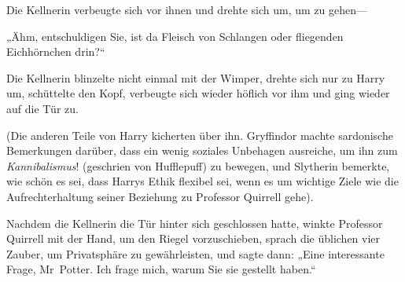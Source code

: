 Die Kellnerin verbeugte sich vor ihnen und drehte sich um, um zu gehen—

„Ähm, entschuldigen Sie, ist da Fleisch von Schlangen oder fliegenden Eichhörnchen drin?“

Die Kellnerin blinzelte nicht einmal mit der Wimper, drehte sich nur zu Harry um, schüttelte den Kopf, verbeugte sich wieder höflich vor ihm und ging wieder auf die Tür zu.

(Die anderen Teile von Harry kicherten über ihn. Gryffindor machte sardonische Bemerkungen darüber, dass ein wenig soziales Unbehagen ausreiche, um ihn zum \emph{Kannibalismus}! (geschrien von Hufflepuff) zu bewegen, und Slytherin bemerkte, wie schön es sei, dass Harrys Ethik flexibel sei, wenn es um wichtige Ziele wie die Aufrechterhaltung seiner Beziehung zu Professor Quirrell gehe).

Nachdem die Kellnerin die Tür hinter sich geschlossen hatte, winkte Professor Quirrell mit der Hand, um den Riegel vorzuschieben, sprach die üblichen vier Zauber, um Privatsphäre zu gewährleisten, und sagte dann: „Eine interessante Frage, Mr~Potter. Ich frage mich, warum Sie sie gestellt haben.“

